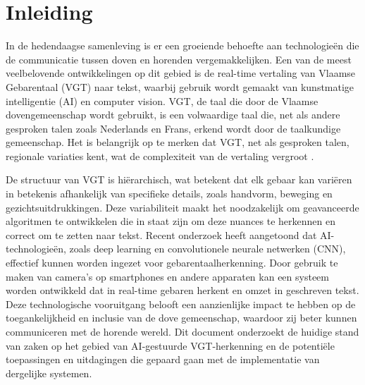 


% 
\section{Inleiding}%
\label{sec:inleiding}

In de hedendaagse samenleving is er een groeiende behoefte aan technologieën die de communicatie tussen doven en horenden vergemakkelijken. Een van de meest veelbelovende ontwikkelingen op dit gebied is de real-time vertaling van Vlaamse Gebarentaal (VGT) naar tekst, waarbij gebruik wordt gemaakt van kunstmatige intelligentie (AI) en computer vision. VGT, de taal die door de Vlaamse dovengemeenschap wordt gebruikt, is een volwaardige taal die, net als andere gesproken talen zoals Nederlands en Frans, erkend wordt door de taalkundige gemeenschap. Het is belangrijk op te merken dat VGT, net als gesproken talen, regionale variaties kent, wat de complexiteit van de vertaling vergroot \autocite{vanmeerbergen2000simultane}.

De structuur van VGT is hiërarchisch, wat betekent dat elk gebaar kan variëren in betekenis afhankelijk van specifieke details, zoals handvorm, beweging en gezichtsuitdrukkingen. \autocite{469340}
Deze variabiliteit maakt het noodzakelijk om geavanceerde algoritmen te ontwikkelen die in staat zijn om deze nuances te herkennen en correct om te zetten naar tekst. 
Recent onderzoek heeft aangetoond dat AI-technologieën, zoals deep learning en convolutionele neurale netwerken (CNN), effectief kunnen worden ingezet voor gebarentaalherkenning.\autocite{10.52756/ijerr.2023.v34spl.004}\autocite{10.17485/ijst/v16i45.2583}
Door gebruik te maken van camera's op smartphones en andere apparaten kan een systeem worden ontwikkeld dat in real-time gebaren herkent en omzet in geschreven tekst.
Deze technologische vooruitgang belooft een aanzienlijke impact te hebben op de toegankelijkheid en inclusie van de dove gemeenschap, waardoor zij beter kunnen communiceren met de horende wereld. Dit document onderzoekt de huidige stand van zaken op het gebied van AI-gestuurde VGT-herkenning en de potentiële toepassingen en uitdagingen die gepaard gaan met de implementatie van dergelijke systemen.


